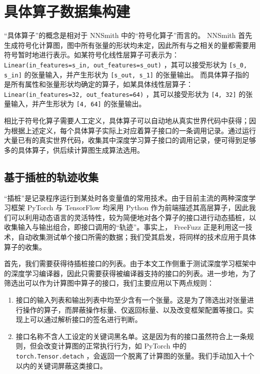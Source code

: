 \section{具体算子数据集构建}

“具体算子”的概念是相对于 NNSmith 中的“符号化算子”而言的。 NNSmith 首先生成符号化计算图，图中所有张量的形状均未定，因此所有与之相关的量都需要用符号暂时地进行表示。如某符号化线性层算子可表示为： \texttt{Linear(in\_features=s\_in, out\_features=s\_out)} ，其可以接受形状为 \texttt{[s\_0, s\_in]} 的张量输入，并产生形状为 \texttt{[s\_out, s\_1]} 的张量输出。
而具体算子指的是所有属性和张量形状均确定的算子，如某具体线性层算子： \texttt{Linear(in\_features=32, out\_features=64)} ，其可以接受形状为 \texttt{[4, 32]} 的张量输入，并产生形状为 \texttt{[4, 64]} 的张量输出。

相比于符号化算子需要人工定义，具体算子可以自动地从真实世界代码中获得；因为根据上述定义，每个具体算子实际上对应着算子接口的一条调用记录。通过运行大量已有的真实世界代码，收集其中深度学习算子接口的调用记录，便可得到足够多的具体算子，供后续计算图生成算法选用。

\subsection{基于插桩的轨迹收集}
\label{sec:collect}

“插桩”是记录程序运行到某处时各变量值的常用技术。由于目前主流的两种深度学习框架 PyTorch 与 TensorFlow 均采用 Python 作为前端描述其高层算子，因此我们可以利用动态语言的灵活特性，较为简便地对各个算子的接口进行动态插桩，以收集输入与输出组合，即接口调用的“轨迹”。事实上， FreeFuzz 正是利用这一技术，自动收集测试单个接口所需的数据；我们受其启发，将同样的技术应用于具体算子的收集。

首先，我们需要获得待插桩接口的列表。由于本文工作侧重于测试深度学习框架中的深度学习编译器，因此只需要获得被编译器支持的接口的列表。进一步地，为了筛选出可以作为计算图中算子的接口，我们主要应用以下两点规则：
\begin{enumerate}
    \item 接口的输入列表和输出列表中均至少含有一个张量。这是为了筛选出对张量进行操作的算子，而屏蔽操作标量、仅返回标量、以及改变框架配置等接口。实现上可以通过解析接口的签名进行判断。
    \item 接口名称不含人工设定的关键词黑名单。这是因为有的接口虽然符合上一条规则，但会改变计算图的正常执行行为，如 PyTorch 中的 \texttt{torch.Tensor.detach} ，会返回一个脱离了计算图的张量。我们手动加入十个以内的关键词屏蔽这类接口。
\end{enumerate}

